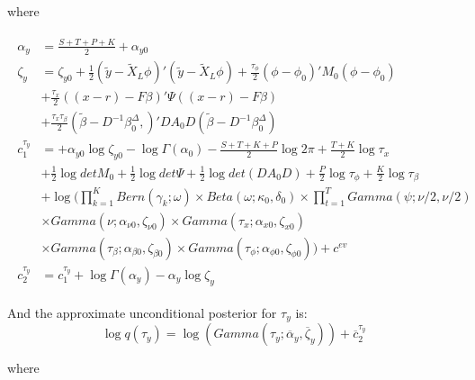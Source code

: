 \documentclass[11pt]{article}
\begin{document}
where

\begin{align*}
\begin{split}
	\alpha_{y}	&=	\frac{S+T+P+K}{2}+\alpha_{y0}\\
	\zeta_{y}	&=	\zeta_{y0}+\frac{1}{2}\left(\tilde{y}-\tilde{X}_{L}\phi\right)'\left(\tilde{y}-\tilde{X}_{L}\phi\right)+\frac{\tau_{\phi}}{2}\left(\phi-\phi_{0}\right)'M_{0}\left(\phi-\phi_{0}\right)\\
			&+\frac{\tau_{x}}{2}\left(\left(x-r\right)-F\beta\right)'\Psi\left(\left(x-r\right)-F\beta\right)\\
			&+\frac{\tau_{x}\tau_{\beta}}{2}\left(\tilde{\beta}-D^{-1}\beta_{0}^{\Delta},\right)'DA_{0}D\left(\tilde{\beta}-D^{-1}\beta_{0}^{\Delta}\right)\\
	c_{1}^{\tau_{y}}
			&=+\alpha_{y0}\log\zeta_{y0}-\log\Gamma\left(\alpha_{0}\right)-\frac{S+T+K+P}{2}\log2\pi+\frac{T+K}{2}\log\tau_{x}\\
			&+\frac{1}{2}\log detM_{0}+\frac{1}{2}\log det\Psi+\frac{1}{2}\log det\left(DA_{0}D\right)+\frac{P}{2}\log\tau_{\phi}+\frac{K}{2}\log\tau_{\beta}\\
			&+\log\Bigg(\prod_{k=1}^{K}Bern\left(\gamma_{k};\omega\right)\times Beta\left(\omega;\kappa_{0},\delta_{0}\right)\times\prod_{t=1}^{T}Gamma\left(\psi;\nu/2,\nu/2\right)\\
			&\times Gamma\left(\nu;\alpha_{\nu0},\zeta_{\nu0}\right)\times Gamma\left(\tau_{x};\alpha_{x0},\zeta_{x0}\right)\\
			&\times Gamma\left(\tau_{\beta};\alpha_{\beta0},\zeta_{\beta0}\right)\times Gamma\left(\tau_{\phi};\alpha_{\phi0},\zeta_{\phi0}\right)\Bigg)+c^{ev}\\
	c_{2}^{\tau_{y}}
			&=c_{1}^{\tau_{y}}+\log\Gamma\left(\alpha_{y}\right)-\alpha_{y}\log\zeta_{y}
\end{split}
\end{align*}

And the approximate unconditional posterior for $\tau_y$ is:
\begin{equation}
	\log q\left(\tau_{y}\right) = \log\left(Gamma\left(\tau_{y};\overline{\alpha}_{y},\overline{\zeta}_{y}\right)\right)+\overline{c}_{2}^{\tau_{y}}
\end{equation}

where
\end{document}
